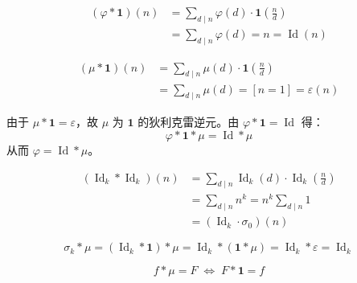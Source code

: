 \[
\begin{aligned}
(\varphi * \mathbf{1})(n) 
&= \sum_{d\mid n} \varphi(d) \cdot \mathbf{1}\!\left(\frac{n}{d}\right) \\
&= \sum_{d\mid n} \varphi(d) = n = \operatorname{Id}(n)
\end{aligned}
\]

\[
\begin{aligned}
(\mu * \mathbf{1})(n) 
&= \sum_{d\mid n} \mu(d) \cdot \mathbf{1}\!\left(\frac{n}{d}\right) \\
&= \sum_{d\mid n} \mu(d) = [n=1] = \varepsilon(n)
\end{aligned}
\]

由于 $\mu * \mathbf{1} = \varepsilon$，故 $\mu$ 为 $\mathbf{1}$ 的狄利克雷逆元。由 $\varphi * \mathbf{1} = \operatorname{Id}$ 得：
\[
\varphi * \mathbf{1} * \mu = \operatorname{Id} * \mu
\]
从而 $\varphi = \operatorname{Id} * \mu$。

\[
\begin{aligned}
(\operatorname{Id}_k * \operatorname{Id}_k)(n) 
&= \sum_{d\mid n} \operatorname{Id}_k(d) \cdot \operatorname{Id}_k\!\left(\frac{n}{d}\right) \\
&= \sum_{d\mid n} n^k = n^k \sum_{d\mid n} 1 \\
&= (\operatorname{Id}_k \cdot \sigma_0)(n)
\end{aligned}
\]

\[
\sigma_k * \mu = (\operatorname{Id}_k * \mathbf{1}) * \mu = \operatorname{Id}_k * (\mathbf{1} * \mu) = \operatorname{Id}_k * \varepsilon = \operatorname{Id}_k
\]

\[
f * \mu = F \;\Longleftrightarrow\; F * \mathbf{1} = f
\]